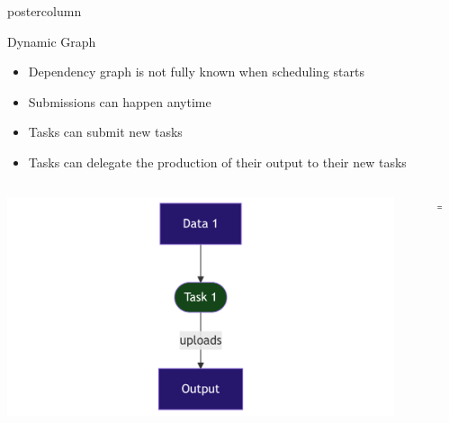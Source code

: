 \begin{frame}[fragile]
\begin{columns}[T]
\begin{column}{.49\textwidth}
\begin{beamercolorbox}[center,wd=\textwidth]{postercolumn}
\begin{minipage}[T]{.96\textwidth}

            \begin{block}{Dynamic Graph}
            \begin{itemize}
                \item Dependency graph is not fully known when scheduling starts
                \item Submissions can happen anytime
                \item Tasks can submit new tasks
                \item Tasks can delegate the production of their output to their new tasks
            \end{itemize}
            \begin{columns}[T]
            \begin{column}{0.3\textwidth}
                \centering
                \vspace{1cm}
                \vfill
                \includegraphics[width=0.95\textwidth]{mermaid-dynamic-part1.png}
            \end{column}
            \begin{column}{0.05\textwidth}
                \centering
                \vspace{1.7cm}
                \vfill
                $\Rightarrow$
            \end{column}
            \begin{column}{0.65\textwidth}
                \centering

\end{column}
\end{columns}
\end{block}
\end{minipage}
\end{beamercolorbox}
\end{column}
\end{columns}
\end{frame}
